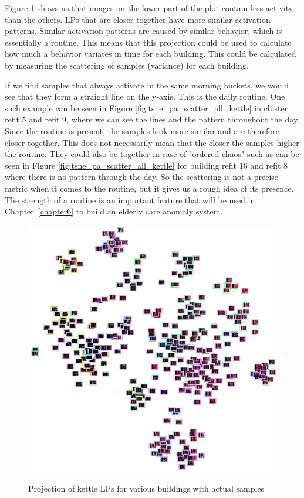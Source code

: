 Figure \ref{fig:tsne_pa_img_scatter_all_kettle} shows us that images on the lower part 
of the plot contain less activity than the others. 
LPs that are closer together have more similar activation patterns.
Similar activation patterns are caused by similar behavior, which is essentially a routine.
This means that this projection could be used to calculate how much a behavior variates in time for each building.
This could be calculated by measuring the scattering of samples (variance) for each building.

If we find samples that always activate in the same morning buckets, we would see that they form a straight line on the y-axis.
This is the daily routine. One such example can be seen in Figure \ref{fig:tsne_pa_scatter_all_kettle} in cluster refit 5 and refit 9, where we can see the lines and the pattern throughout the day. 
Since the routine is present, the samples look more similar and are therefore closer together. 
This does not necessarily mean that the closer the samples higher the routine.
They could also be together in case of "ordered chaos" such as can be seen in Figure \ref{fig:tsne_pa_scatter_all_kettle} for building refit 16 and refit 8 where there is no pattern through the day.
So the scattering is not a precise metric when it comes to the routine, but it gives us a rough idea of its presence.
The strength of a routine is an important feature that will be used
in Chapter \ref{chapter6} to build an elderly care anomaly system.

\begin{figure}[H]
	\centering
	\caption{Projection of kettle LPs for various buildings with actual samples}
	\includegraphics[width=.9\textwidth]{Figures/TSNE/TSNE_per_appliance/img_scatter_refit_kettle.png}
	\label{fig:tsne_pa_img_scatter_all_kettle}
\end{figure}

